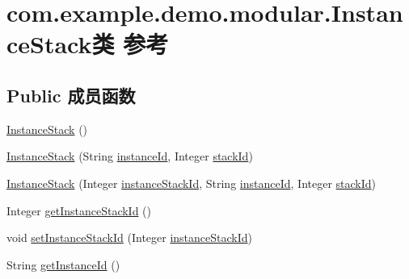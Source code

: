 \hypertarget{classcom_1_1example_1_1demo_1_1modular_1_1_instance_stack}{}\section{com.\+example.\+demo.\+modular.\+Instance\+Stack类 参考}
\label{classcom_1_1example_1_1demo_1_1modular_1_1_instance_stack}
\subsection*{Public 成员函数}
\begin{DoxyCompactItemize}
\item 
\mbox{\hyperlink{classcom_1_1example_1_1demo_1_1modular_1_1_instance_stack_a4fccd59df4ea361a40dfb8671b0f5f62}{Instance\+Stack}} ()
\item 
\mbox{\hyperlink{classcom_1_1example_1_1demo_1_1modular_1_1_instance_stack_aed47036ac58992bb99515422c2827d86}{Instance\+Stack}} (String \mbox{\hyperlink{classcom_1_1example_1_1demo_1_1modular_1_1_instance_stack_a9fb231110ca9340840834dd2b594c0c9}{instance\+Id}}, Integer \mbox{\hyperlink{classcom_1_1example_1_1demo_1_1modular_1_1_instance_stack_af1789816367b30906b2d1220eda5ea77}{stack\+Id}})
\item 
\mbox{\hyperlink{classcom_1_1example_1_1demo_1_1modular_1_1_instance_stack_a26c38b9a373d3ce6875e94dcbcd00745}{Instance\+Stack}} (Integer \mbox{\hyperlink{classcom_1_1example_1_1demo_1_1modular_1_1_instance_stack_a6089eddd02b241e3a4daf16dd82bda6f}{instance\+Stack\+Id}}, String \mbox{\hyperlink{classcom_1_1example_1_1demo_1_1modular_1_1_instance_stack_a9fb231110ca9340840834dd2b594c0c9}{instance\+Id}}, Integer \mbox{\hyperlink{classcom_1_1example_1_1demo_1_1modular_1_1_instance_stack_af1789816367b30906b2d1220eda5ea77}{stack\+Id}})
\item 
Integer \mbox{\hyperlink{classcom_1_1example_1_1demo_1_1modular_1_1_instance_stack_a8a82eafce3a2f8bbe15361d306d467a3}{get\+Instance\+Stack\+Id}} ()
\item 
void \mbox{\hyperlink{classcom_1_1example_1_1demo_1_1modular_1_1_instance_stack_a68d4950367e17eaefd1c8585d2459b1e}{set\+Instance\+Stack\+Id}} (Integer \mbox{\hyperlink{classcom_1_1example_1_1demo_1_1modular_1_1_instance_stack_a6089eddd02b241e3a4daf16dd82bda6f}{instance\+Stack\+Id}})
\item 
String \mbox{\hyperlink{classcom_1_1example_1_1demo_1_1modular_1_1_instance_stack_aca079b78360b6cc31b9a0d78518c7715}{get\+Instance\+Id}} ()

\end{DoxyCompactItemize}

